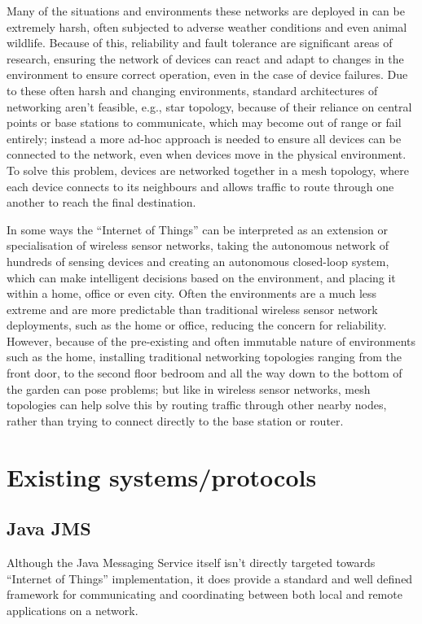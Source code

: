 Many of the situations and environments these networks are deployed in can be extremely harsh, often subjected to adverse weather conditions and even animal wildlife. Because of this, reliability and fault tolerance are significant areas of research, ensuring the network of devices can react and adapt to changes in the environment to ensure correct operation, even in the case of device failures. Due to these often harsh and changing environments, standard architectures of networking aren't feasible, e.g., star topology, because of their reliance on central points or base stations to communicate, which may become out of range or fail entirely; instead a more ad-hoc approach is needed to ensure all devices can be connected to the network, even when devices move in the physical environment. To solve this problem, devices are networked together in a mesh topology, where each device connects to its neighbours and allows traffic to route through one another to reach the final destination.

In some ways the ``Internet of Things'' can be interpreted as an extension or specialisation of wireless sensor networks, taking the autonomous network of hundreds of sensing devices and creating an autonomous closed-loop system, which can make intelligent decisions based on the environment, and placing it within a home, office or even city. Often the environments are a much less extreme and are more predictable than traditional wireless sensor network deployments, such as the home or office, reducing the concern for reliability. However, because of the pre-existing and often immutable nature of environments such as the home, installing traditional networking topologies ranging from the front door, to the second floor bedroom and all the way down to the bottom of the garden can pose problems; but like in wireless sensor networks, mesh topologies can help solve this by routing traffic through other nearby nodes, rather than trying to connect directly to the base station or router.


\section{Existing systems/protocols} %
\label{sec:existing_systems_protocols}

\subsection{Java JMS} %
\label{sub:java_jms}
Although the Java Messaging Service itself isn't directly targeted towards ``Internet of Things'' implementation, it does provide a standard and well defined framework for communicating and coordinating between both local and remote applications on a network. 

